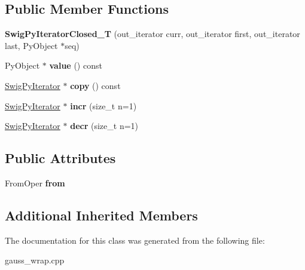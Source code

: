 \subsection*{Public Member Functions}
\begin{DoxyCompactItemize}
\item 
\hypertarget{classswig_1_1_swig_py_iterator_closed___t_ae23b1da812fe9a789dcbc18b4db5ffe9}{{\bfseries Swig\-Py\-Iterator\-Closed\-\_\-\-T} (out\-\_\-iterator curr, out\-\_\-iterator first, out\-\_\-iterator last, Py\-Object $\ast$seq)}\label{classswig_1_1_swig_py_iterator_closed___t_ae23b1da812fe9a789dcbc18b4db5ffe9}

\item 
\hypertarget{classswig_1_1_swig_py_iterator_closed___t_afd8db79726af8529b1f08667ad664c32}{Py\-Object $\ast$ {\bfseries value} () const }\label{classswig_1_1_swig_py_iterator_closed___t_afd8db79726af8529b1f08667ad664c32}

\item 
\hypertarget{classswig_1_1_swig_py_iterator_closed___t_abc73769c7f3877651cf13cf8f5389b5f}{\hyperlink{structswig_1_1_swig_py_iterator}{Swig\-Py\-Iterator} $\ast$ {\bfseries copy} () const }\label{classswig_1_1_swig_py_iterator_closed___t_abc73769c7f3877651cf13cf8f5389b5f}

\item 
\hypertarget{classswig_1_1_swig_py_iterator_closed___t_a1bf667d0f643064b452ecb2fc5e48df2}{\hyperlink{structswig_1_1_swig_py_iterator}{Swig\-Py\-Iterator} $\ast$ {\bfseries incr} (size\-\_\-t n=1)}\label{classswig_1_1_swig_py_iterator_closed___t_a1bf667d0f643064b452ecb2fc5e48df2}

\item 
\hypertarget{classswig_1_1_swig_py_iterator_closed___t_aafae78acb63a1c4acaf2a76d4e9f6267}{\hyperlink{structswig_1_1_swig_py_iterator}{Swig\-Py\-Iterator} $\ast$ {\bfseries decr} (size\-\_\-t n=1)}\label{classswig_1_1_swig_py_iterator_closed___t_aafae78acb63a1c4acaf2a76d4e9f6267}

\end{DoxyCompactItemize}
\subsection*{Public Attributes}
\begin{DoxyCompactItemize}
\item 
\hypertarget{classswig_1_1_swig_py_iterator_closed___t_a8a87b95d1e7e7d0784866dc71189575d}{From\-Oper {\bfseries from}}\label{classswig_1_1_swig_py_iterator_closed___t_a8a87b95d1e7e7d0784866dc71189575d}

\end{DoxyCompactItemize}
\subsection*{Additional Inherited Members}


The documentation for this class was generated from the following file\-:\begin{DoxyCompactItemize}
\item 
gauss\-\_\-wrap.\-cpp\end{DoxyCompactItemize}
